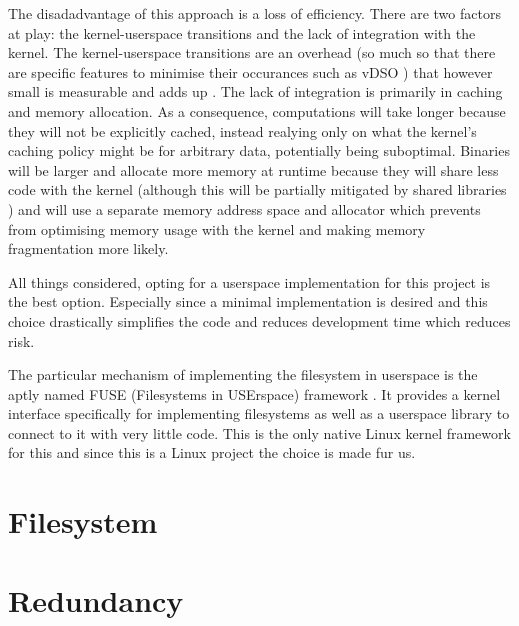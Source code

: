         The disadadvantage of this approach is a loss of efficiency. There are
        two factors at play: the kernel-userspace transitions and the lack of
        integration with the kernel. The kernel-userspace transitions are an
        overhead (so much so that there are specific features to minimise their
        occurances such as vDSO
        \cite{https://man7.org/linux/man-pages/man7/vdso.7.html}) that however
        small is measurable and adds up
        \cite{https://eli.thegreenplace.net/2018/measuring-context-switching-and-memory-overheads-for-linux-threads/}.
        The lack of integration is primarily in caching and memory allocation.
        As a consequence, computations will take longer because they will not
        be explicitly cached, instead realying only on what the kernel's
        caching policy might be for arbitrary data, potentially being
        suboptimal. Binaries will be larger and allocate more memory at runtime
        because they will share less code with the kernel (although this will
        be partially mitigated by shared libraries
        \cite{https://tldp.org/HOWTO/Program-Library-HOWTO/shared-libraries.html})
        and will use a separate memory address space and allocator which
        prevents from optimising memory usage with the kernel and making memory
        fragmentation more likely.

        All things considered, opting for a userspace implementation for this
        project is the best option. Especially since a minimal implementation
        is desired and this choice drastically simplifies the code and reduces
        development time which reduces risk.

        The particular mechanism of implementing the filesystem in userspace is
        the aptly named FUSE (Filesystems in USErspace) framework
        \cite{https://www.kernel.org/doc/html/latest/filesystems/fuse.html}. It
        provides a kernel interface specifically for implementing filesystems
        as well as a userspace library to connect to it with very little code.
        This is the only native Linux kernel framework for this and since this
        is a Linux project the choice is made fur us.

    \section{Filesystem}

    \section{Redundancy}

